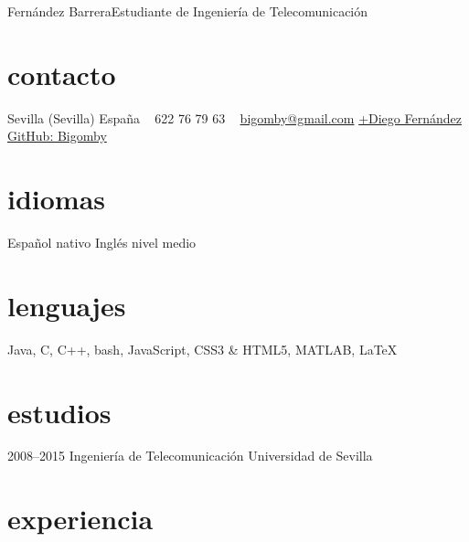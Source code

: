 \documentclass[hidelinks]{friggeri-cv} %
\begin{document}
 {Fernández Barrera}{Estudiante de Ingeniería de Telecomunicación} %


\begin{aside} %
\section{contacto}
Sevilla (Sevilla)
España
~
622 76 79 63
~
\href{mailto:bigomby@gmail.com}{bigomby@gmail.com}
\href{http://google.com/+DiegoFernandezBarrera}{+Diego Fernández}
\href{https://github.com/Bigomby}{GitHub: Bigomby}
\section{idiomas}
Español nativo
Inglés nivel medio
\section{lenguajes}
{Java, C, C++, bash, JavaScript, CSS3 \& HTML5, MATLAB, \LaTeX}
\end{aside}


\section{estudios}

\begin{entrylist}
\entry
{2008--2015}
{Ingeniería {\normalfont de Telecomunicación}}
{Universidad de Sevilla}
{}
\end{entrylist}


\section{experiencia}
\end{document}
